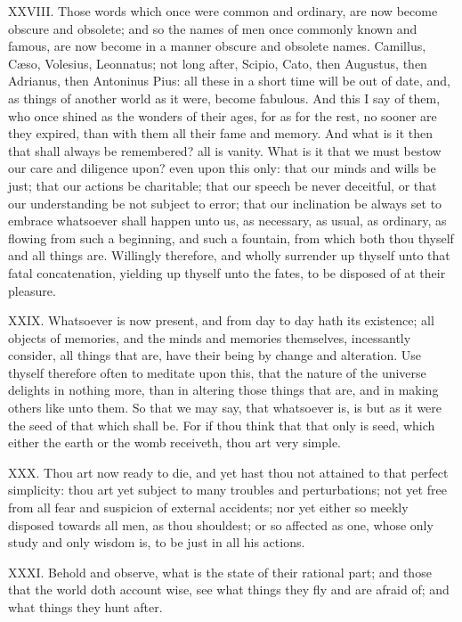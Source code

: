 XXVIII. Those words which once were common and ordinary, are now become
obscure and obsolete; and so the names of men once commonly known and
famous, are now become in a manner obscure and obsolete names. Camillus,
Cæso, Volesius, Leonnatus; not long after, Scipio, Cato, then Augustus,
then Adrianus, then Antoninus Pius: all these in a short time will be out
of date, and, as things of another world as it were, become fabulous. And
this I say of them, who once shined as the wonders of their ages, for as
for the rest, no sooner are they expired, than with them all their fame
and memory. And what is it then that shall always be remembered? all is
vanity. What is it that we must bestow our care and diligence upon? even
upon this only: that our minds and wills be just; that our actions be
charitable; that our speech be never deceitful, or that our understanding
be not subject to error; that our inclination be always set to embrace
whatsoever shall happen unto us, as necessary, as usual, as ordinary, as
flowing from such a beginning, and such a fountain, from which both thou
thyself and all things are. Willingly therefore, and wholly surrender up
thyself unto that fatal concatenation, yielding up thyself unto the fates,
to be disposed of at their pleasure.

XXIX. Whatsoever is now present, and from day to day hath its existence;
all objects of memories, and the minds and memories themselves,
incessantly consider, all things that are, have their being by change and
alteration. Use thyself therefore often to meditate upon this, that the
nature of the universe delights in nothing more, than in altering those
things that are, and in making others like unto them. So that we may say,
that whatsoever is, is but as it were the seed of that which shall be. For
if thou think that that only is seed, which either the earth or the womb
receiveth, thou art very simple.

XXX. Thou art now ready to die, and yet hast thou not attained to
that perfect simplicity: thou art yet subject to many troubles and
perturbations; not yet free from all fear and suspicion of external
accidents; nor yet either so meekly disposed towards all men, as thou
shouldest; or so affected as one, whose only study and only wisdom is, to
be just in all his actions.

XXXI. Behold and observe, what is the state of their rational part; and
those that the world doth account wise, see what things they fly and are
afraid of; and what things they hunt after.

